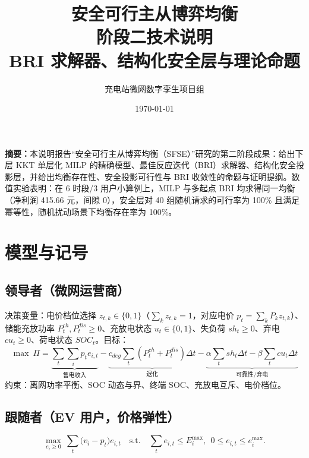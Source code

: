 \documentclass[UTF8,a4paper,11pt]{ctexart}
\title{\vspace{-1.4cm}\textbf{\color{mainblue}安全可行主从博弈均衡\\阶段二技术说明}\\[6pt]
\large BRI 求解器、结构化安全层与理论命题}
\author{充电站微网数字孪生项目组}
\date{\today}
\theoremstyle{remark}
\begin{document}
\maketitle
\thispagestyle{fancy}

\begin{center}
\begin{minipage}{0.93\textwidth}
\small
\textbf{摘要：}本说明报告“安全可行主从博弈均衡（SFSE）”研究的第二阶段成果：给出下层 KKT 单层化 MILP 的精确模型、最佳反应迭代（BRI）求解器、结构化安全投影层，并给出均衡存在性、安全投影可行性与 BRI 收敛性的命题与证明提纲。数值实验表明：在 6 时段/3 用户小算例上，MILP 与多起点 BRI 均求得同一均衡（净利润 415.66 元，间隙 0），安全层对 40 组随机请求的可行率为 100\% 且满足幂等性，随机扰动场景下均衡存在率为 100\%。
\end{minipage}
\end{center}

\vspace{0.4cm}

\section{模型与记号}

\subsection{领导者（微网运营商）}
决策变量：电价档位选择 $z_{t,k}\in\{0,1\}$（$\sum_k z_{t,k}=1$，对应电价 $p_t=\sum_k P_k z_{t,k}$）、储能充放功率 $P^{ch}_t,P^{dis}_t\ge0$、充放电状态 $u_t\in\{0,1\}$、失负荷 $sh_t\ge0$、弃电 $cu_t\ge0$、荷电状态 $SOC_t$。目标：
\begin{equation}
\max\ \Pi=\underbrace{\sum_{t}\sum_{i} p_t e_{i,t}}_{\text{售电收入}}
-\underbrace{c_{deg}\sum_t(P^{ch}_t+P^{dis}_t)\Delta t}_{\text{退化}}
-\underbrace{\alpha\sum_t sh_t\Delta t-\beta\sum_t cu_t\Delta t}_{\text{可靠性/弃电}}
\end{equation}
约束：离网功率平衡、SOC 动态与界、终端 SOC、充放电互斥、电价档位。

\subsection{跟随者（EV 用户，价格弹性）}
\begin{equation}
\max_{e_i\ge0}\ \sum_{t}\big(v_i-p_t\big)e_{i,t}
\quad\text{s.t.}\quad \sum_t e_{i,t}\le E_i^{\max},\ \ 0\le e_{i,t}\le e_i^{\max}.
\end{equation}
\end{document}
